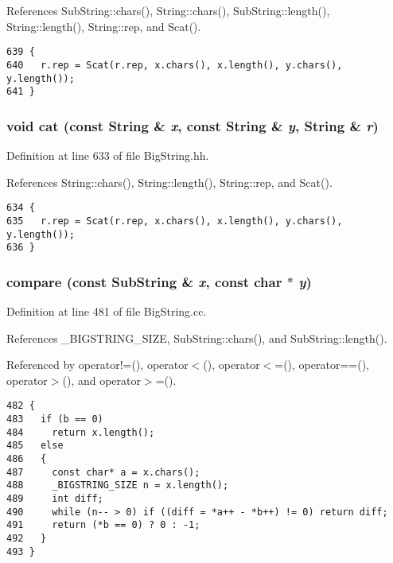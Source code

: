 References Sub\-String::chars(), String::chars(), Sub\-String::length(), String::length(), String::rep, and Scat().



\footnotesize\begin{verbatim}639 {
640   r.rep = Scat(r.rep, x.chars(), x.length(), y.chars(), y.length());
641 }
\end{verbatim}\normalsize 
{}
\subsubsection{\setlength{\rightskip}{0pt plus 5cm}void cat (const {\bf String} \& {\em x}, const {\bf String} \& {\em y}, {\bf String} \& {\em r})\hspace{0.3cm}{\tt  [inline]}}\label{BigString_8hh_a34}




Definition at line 633 of file Big\-String.hh.

References String::chars(), String::length(), String::rep, and Scat().



\footnotesize\begin{verbatim}634 {
635   r.rep = Scat(r.rep, x.chars(), x.length(), y.chars(), y.length());
636 }
\end{verbatim}\normalsize 
{}
\subsubsection{ compare (const {\bf Sub\-String} \& {\em x}, const char $\ast$ {\em y})}\label{BigString_8hh_a32}




Definition at line 481 of file Big\-String.cc.

References \_\-BIGSTRING\_\-SIZE, Sub\-String::chars(), and Sub\-String::length().

Referenced by operator!=(), operator$<$(), operator$<$=(), operator==(), operator$>$(), and operator$>$=().



\footnotesize\begin{verbatim}482 {
483   if (b == 0)
484     return x.length();
485   else
486   {
487     const char* a = x.chars();
488     _BIGSTRING_SIZE n = x.length();
489     int diff;
490     while (n-- > 0) if ((diff = *a++ - *b++) != 0) return diff;
491     return (*b == 0) ? 0 : -1;
492   }
493 }
\end{verbatim}\normalsize 
{}
